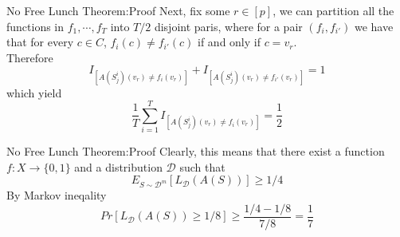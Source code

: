 \documentclass{beamer}
\begin{document}
\begin{frame}{No Free Lunch Theorem:Proof}
	Next, fix some $r \in [p]$, we can partition all the functions in $f_1, \cdots, f_T$ into $T/2$ disjoint paris, where for a pair $(f_i,f_{i'})$ we have that for every $c \in C$, $f_i(c) \neq f_{i'}(c)$ if and only if $c = v_r$. \\
	Therefore
	\[ I_{[A(S^i_j)(v_r) \neq f_i(v_r)]} +  I_{[A(S^i_j)(v_r) \neq f_{i'}(v_r)]} = 1\]
	which yield
	\[\frac{1}{T} \sum^T_{i=1}  I_{[A(S^i_j)(v_r) \neq f_i(v_r)]} = \frac{1}{2}\]
\end{frame}
\begin{frame}{No Free Lunch Theorem:Proof}
	Clearly, this means that there exist a function $f:X \rightarrow \{0,1\}$ and a distribution $\mathcal{D}$ such that 
	\[E_{S \sim \mathcal{D}^m} [L_{\mathcal{D}} (A(S))] \geq 1/4\]
	By Markov ineqality
	\[Pr[L_{\mathcal{D}} (A(S)) \geq 1/8] \geq \frac{1/4 - 1/8}{7/8} = \frac{1}{7} \]
	
\end{frame}
\end{document}
